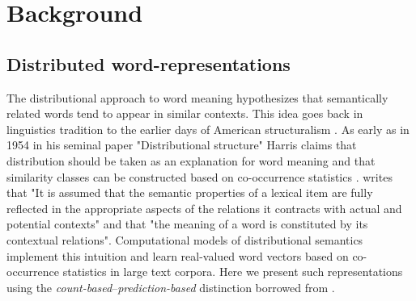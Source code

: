 \begin{comment}
Chapter~\ref{ch:COLI} introduces a recurrent and convolutional neural network
based model that learns from both visual-grounding signals and
word-word co-occurrences. We develop techniques to interpret the learned
representations of such an architecture and investigate if certain linguistic
phenomena is encoded in the learned model.

Chapter~\ref{ch:IJCNLP} provides empirical evidence that grounded learning
can improve machine translation quality.
In Chapter~\ref{ch:ConLL} we show under what conditions multilinguality an help improve grounded
representations.


\end{comment}

\chapter{Background}
\label{ch:background}

\section{Distributed word-representations}
\label{sec:words}
The distributional approach to word meaning hypothesizes that semantically related words
tend to appear in similar contexts. This idea goes back in linguistics tradition to the
earlier days of American structuralism \citep{nevin2002legacy}.  
As early as in 1954 in his seminal paper "Distributional structure" Harris claims
that distribution should be taken as an explanation for word meaning and that similarity classes
can be constructed based on co-occurrence statistics \citep{harris1954distributional}.
\cite{cruse1986lexical} writes that "It is  assumed  that  the  semantic properties  of
a lexical  item  are  fully  reflected  in  the  appropriate  aspects  of  the  relations
it  contracts  with  actual  and  potential  contexts" and that "the  meaning  of  a word
is constituted  by  its  contextual  relations". Computational models of distributional
semantics implement this intuition and learn real-valued word vectors based on co-occurrence
statistics in large text corpora. Here we present such representations using the \emph{count-based}--\emph{prediction-based} distinction borrowed from \cite{baroni2014don}.

